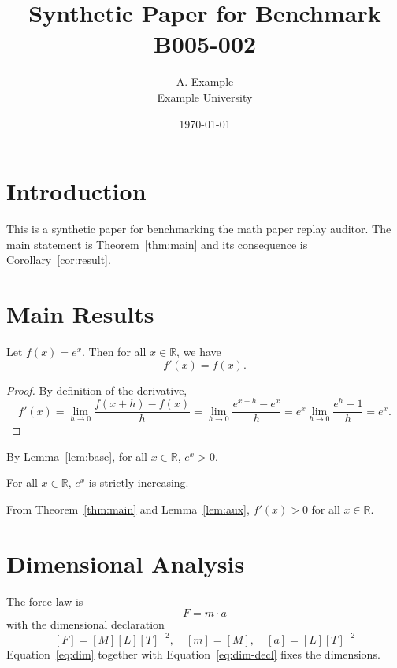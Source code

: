 \documentclass{article}
\title{Synthetic Paper for Benchmark B005-002}
\author{A. Example \\ Example University}
\date{\today}
\begin{document}
\maketitle

\section{Introduction}
This is a synthetic paper for benchmarking the math paper replay auditor.
The main statement is Theorem~\ref{thm:main} and its consequence is
Corollary~\ref{cor:result}.

\section{Main Results}
\begin{theorem}
\label{thm:main}
Let $f(x) = e^x$. Then for all $x \in \mathbb{R}$, we have
\begin{equation}
\label{eq:main}
f'(x) = f(x).
\end{equation}
\end{theorem}

\begin{proof}
By definition of the derivative,
\begin{equation}
\label{eq:deriv}
f'(x) = \lim_{h \to 0} \frac{f(x+h) - f(x)}{h} = \lim_{h \to 0} \frac{e^{x+h} - e^x}{h} = e^x \lim_{h \to 0} \frac{e^h - 1}{h} = e^x.
\end{equation}
\end{proof}

\begin{lemma}
\label{lem:aux}
By Lemma~\ref{lem:base}, for all $x \in \mathbb{R}$, $e^x > 0$.
\end{lemma}

\begin{lemma}
For all $x \in \mathbb{R}$, $e^x$ is strictly increasing.
\end{lemma}

\begin{corollary}
\label{cor:result}
From Theorem~\ref{thm:main} and Lemma~\ref{lem:aux}, $f'(x) > 0$ for all $x \in \mathbb{R}$.
\end{corollary}

\section{Dimensional Analysis}
The force law is
\begin{equation}
\label{eq:dim}
F = m \cdot a
\end{equation}
with the dimensional declaration
\begin{equation}
\label{eq:dim-decl}
[F] = [M][L][T]^{-2}, \quad [m] = [M], \quad [a] = [L][T]^{-2}
\end{equation}
Equation~\ref{eq:dim} together with Equation~\ref{eq:dim-decl} fixes the dimensions.
\end{document}
